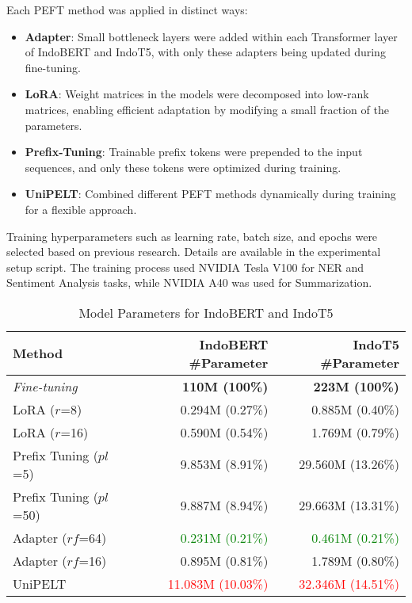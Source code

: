 Each PEFT method was applied in distinct ways:
\begin{itemize}
    \item \textbf{Adapter}: Small bottleneck layers were added within each Transformer layer of IndoBERT and IndoT5, with only these adapters being updated during fine-tuning.
    \item \textbf{LoRA}: Weight matrices in the models were decomposed into low-rank matrices, enabling efficient adaptation by modifying a small fraction of the parameters.
    \item \textbf{Prefix-Tuning}: Trainable prefix tokens were prepended to the input sequences, and only these tokens were optimized during training.
    \item \textbf{UniPELT}: Combined different PEFT methods dynamically during training for a flexible approach.
\end{itemize}

Training hyperparameters such as learning rate, batch size, and epochs were selected based on previous research. Details are available in the experimental setup script. The training process used NVIDIA Tesla V100 for NER and Sentiment Analysis tasks, while NVIDIA A40 was used for Summarization.

\begin{table*}[!ht]
    \centering
    \caption{Model Parameters for IndoBERT and IndoT5}
    \label{table:param-model}
    \begin{tabular}{l|r|r}
        \toprule
        \textbf{Method} & \textbf{IndoBERT \#Parameter} & \textbf{IndoT5 \#Parameter} \\
        \midrule
        \textit{Fine-tuning} & \textbf{110M (100\%)} & \textbf{223M (100\%)} \\
        LoRA ($r$=8) & 0.294M (0.27\%) & 0.885M (0.40\%) \\
        LoRA ($r$=16) & 0.590M (0.54\%) & 1.769M (0.79\%) \\
        Prefix Tuning ($pl$=5) & 9.853M (8.91\%) & 29.560M (13.26\%) \\
        Prefix Tuning ($pl$=50) & 9.887M (8.94\%) & 29.663M (13.31\%) \\
        Adapter ($rf$=64) & \textcolor{Green}{0.231M (0.21\%)} & \textcolor{Green}{0.461M (0.21\%)} \\
        Adapter ($rf$=16) & 0.895M (0.81\%) & 1.789M (0.80\%) \\
        UniPELT & \textcolor{Red}{11.083M (10.03\%)} & \textcolor{Red}{32.346M (14.51\%)} \\
        \bottomrule
    \end{tabular}
\end{table*}

